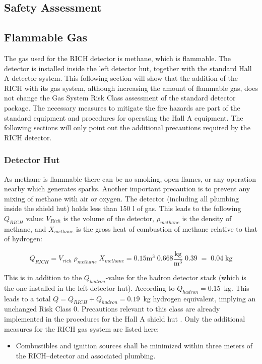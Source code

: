 \begin{safetyen}{0}{0}
\section{Safety Assessment}  

\subsection{Flammable Gas}
\label{sec:rich_hazard}
 
The gas used for the RICH detector 
is methane, which is flammable. The detector is installed inside
the left detector hut, together with the standard Hall A detector system.
This following section will show that the addition of the RICH with its gas system,
although increasing the amount of flammable gas, does not change the 
Gas System Risk Class assessment of the standard detector package. 
The necessary measures to mitigate the fire hazards are part of the standard
equipment and procedures for operating the Hall A equipment.
The following sections will only point out the additional precautions required by the RICH detector.

\subsubsection{Detector Hut}

As methane is flammable there can be no  
smoking, open flames, or any operation nearby which generates sparks.  
Another important precaution is to prevent any mixing of methane with air or 
oxygen.
The detector (including all plumbing inside the shield hut) holds less 
than  150 l of gas. 
This leads to the following $Q_{RICH}$ value:  
$V_{Rich}$ is the  
volume of the detector, 
$\rho_{methane}$ is the density of methane, 
and $X_{methane}$ is the gross heat of combustion of methane relative 
to that of hydrogen: 
 
\begin{equation} 
Q_{RICH} = V_{rich} \; \rho_{methane} \; X_{methane} 
= 0.15 \mbox{m}^3 \; 0.668 \frac{\mbox{kg}}{\mbox{m}^3} \; 0.39 \; = \; 0.04 \; \mbox{kg}
\end{equation} 
 
This is in addition to the $Q_{hadron}$-value for the hadron detector stack (which is 
the one installed in the left detector hut). According to \cite{HazardCalc} $Q_{hadron}=0.15$~kg.
This leads to a total $Q = Q_{RICH} + Q_{hadron} = 0.19$~kg hydrogen equivalent, 
implying an unchanged Risk Class 0. Precautions relevant to this class are already 
implemented in the procedures for the Hall A shield hut \cite{Hawgswww}. Only the 
additional measures for the RICH gas system are listed here:
\begin{itemize}
\item Combustibles and ignition sources shall be minimized within three  
meters of the RICH--detector and associated plumbing. 


\end{itemize}
\end{safetyen}
